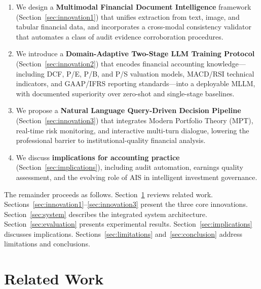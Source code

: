 \documentclass[12pt,letterpaper]{article}
\begin{document}
\begin{enumerate}[leftmargin=2em]
  \item We design a \textbf{Multimodal Financial Document Intelligence}
    framework (Section~\ref{sec:innovation1}) that unifies extraction
    from text, image, and tabular financial data, and incorporates a
    cross-modal consistency validator that automates a class of audit
    evidence corroboration procedures.

  \item We introduce a \textbf{Domain-Adaptive Two-Stage LLM Training
    Protocol} (Section~\ref{sec:innovation2}) that encodes financial
    accounting knowledge---including DCF, P/E, P/B, and P/S valuation
    models, MACD/RSI technical indicators, and GAAP/IFRS reporting
    standards---into a deployable MLLM, with documented superiority
    over zero-shot and single-stage baselines.

  \item We propose a \textbf{Natural Language Query-Driven Decision
    Pipeline} (Section~\ref{sec:innovation3}) that integrates Modern
    Portfolio Theory (MPT), real-time risk monitoring, and interactive
    multi-turn dialogue, lowering the professional barrier to
    institutional-quality financial analysis.

  \item We discuss \textbf{implications for accounting practice}
    (Section~\ref{sec:implications}), including audit automation,
    earnings quality assessment, and the evolving role of AIS in
    intelligent investment governance.
\end{enumerate}

The remainder proceeds as follows.
Section~\ref{sec:literature} reviews related work.
Sections~\ref{sec:innovation1}--\ref{sec:innovation3} present the
three core innovations.
Section~\ref{sec:system} describes the integrated system architecture.
Section~\ref{sec:evaluation} presents experimental results.
Section~\ref{sec:implications} discusses implications.
Sections~\ref{sec:limitations} and~\ref{sec:conclusion} address
limitations and conclusions.

\section{Related Work}
\label{sec:literature}
\end{document}
